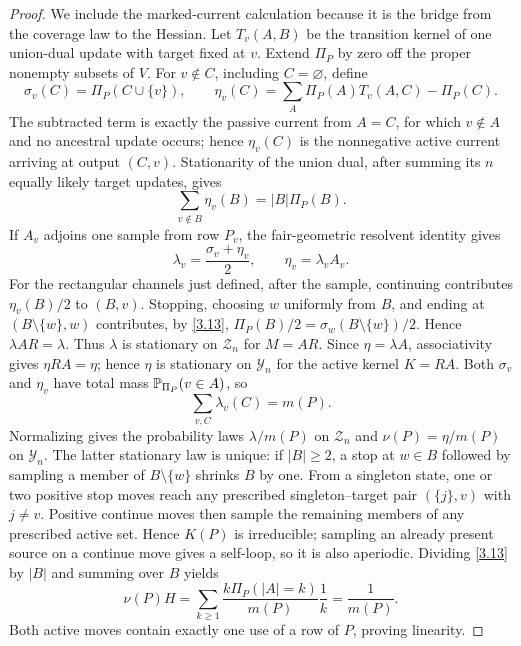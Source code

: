 \begin{proof}
We include the marked-current calculation because it is the bridge from the
coverage law to the Hessian.  Let $T_v(A,B)$ be the transition kernel of one
union-dual update with target fixed at $v$.  Extend $\Pi_P$ by zero off the
proper nonempty subsets of $V$.  For $v\notin C$, including
$C=\varnothing$, define
\[
 \sigma_v(C)=\Pi_P(C\cup\{v\}),\qquad
 \eta_v(C)=\sum_A\Pi_P(A)T_v(A,C)-\Pi_P(C).                 \tag{3.13a}\label{3.13a}
\]
The subtracted term is exactly the passive current from $A=C$, for which
$v\notin A$ and no ancestral update occurs; hence $\eta_v(C)$ is the
nonnegative active current arriving at output $(C,v)$.  Stationarity of the
union dual, after summing its $n$ equally likely target updates, gives
\[
 \sum_{v\notin B}\eta_v(B)=|B|\Pi_P(B).                    \tag{3.13}\label{3.13}
\]
If $A_v$ adjoins one sample from row $P_v$, the fair-geometric resolvent
identity gives
\[
 \lambda_v=\frac{\sigma_v+\eta_v}{2},\qquad
 \eta_v=\lambda_vA_v.                                      \tag{3.14}\label{3.14}
\]
For the rectangular channels just defined, after the sample, continuing contributes
$\eta_v(B)/2$ to $(B,v)$.  Stopping, choosing $w$ uniformly from $B$, and
ending at $(B\setminus\{w\},w)$ contributes, by \eqref{3.13},
$\Pi_P(B)/2=\sigma_w(B\setminus\{w\})/2$.  Hence
$\lambda AR=\lambda$.  Thus $\lambda$ is stationary on $\mathcal Z_n$ for
$M=AR$.  Since $\eta=\lambda A$, associativity gives $\eta RA=\eta$; hence
$\eta$ is stationary on $\mathcal Y_n$ for the active kernel $K=RA$.  Both
$\sigma_v$ and $\eta_v$ have total mass
$\mathbb P_{\Pi_P}(v\in A)$, so
\[
 \sum_{v,C}\lambda_v(C)=m(P).                              \tag{3.15}\label{3.15}
\]
Normalizing gives the probability laws $\lambda/m(P)$ on $\mathcal Z_n$ and
$\nu(P)=\eta/m(P)$ on $\mathcal Y_n$.  The latter stationary law is unique:
if $|B|\ge2$, a stop at $w\in B$ followed by sampling a member of
$B\setminus\{w\}$ shrinks $B$ by one.  From a singleton state, one or two
positive stop moves reach any prescribed singleton--target pair $(\{j\},v)$
with $j\ne v$.  Positive continue moves then sample the remaining members of
any prescribed active set.  Hence $K(P)$ is irreducible; sampling an already
present source on a continue move gives a self-loop, so it is also aperiodic.
Dividing
\eqref{3.13} by $|B|$ and summing over $B$ yields
\[
 \nu(P)H=\sum_{k\ge1}\frac{k\Pi_P(|A|=k)}{m(P)}\frac1k
 =\frac1{m(P)}.                                             \tag{3.16}\label{3.16}
\]
Both active moves contain exactly one use of a row of $P$, proving linearity.
\end{proof}

